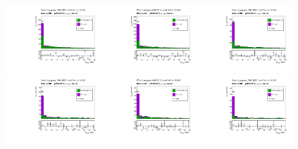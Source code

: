 \begin{figure}[htb]
  \begin{center}
   \includegraphics[width=0.32\textwidth]{../figs/figs_v11/MUON_ZGamma/PrepareYields/c_TotalDATAvsMC_Barrel__phoPFChIsoCorrFSR_EXCLUDED_pt15to20_.pdf}\includegraphics[width=0.32\textwidth]{../figs/figs_v11/MUON_ZGamma/PrepareYields/c_TotalDATAvsMC_Barrel__phoPFChIsoCorrFSR_EXCLUDED_pt20to25_.pdf}\includegraphics[width=0.32\textwidth]{../figs/figs_v11/MUON_ZGamma/PrepareYields/c_TotalDATAvsMC_Barrel__phoPFChIsoCorrFSR_EXCLUDED_pt25to30_.pdf}\\
\includegraphics[width=0.32\textwidth]{../figs/figs_v11/MUON_ZGamma/PrepareYields/c_TotalDATAvsMC_Barrel__phoPFChIsoCorrFSR_EXCLUDED_pt30to35_.pdf}\includegraphics[width=0.32\textwidth]{../figs/figs_v11/MUON_ZGamma/PrepareYields/c_TotalDATAvsMC_Barrel__phoPFChIsoCorrFSR_EXCLUDED_pt35to45_.pdf}\includegraphics[width=0.32\textwidth]{../figs/figs_v11/MUON_ZGamma/PrepareYields/c_TotalDATAvsMC_Barrel__phoPFChIsoCorrFSR_EXCLUDED_pt45to55_.pdf}\\

\end{center}
\end{figure}
